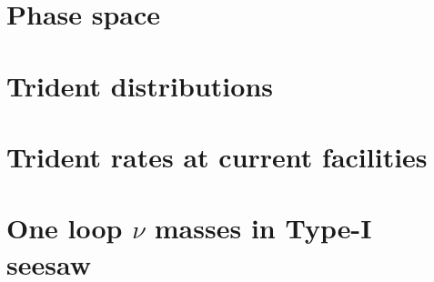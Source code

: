 \documentclass[openany,twoside,frontopenright]{ip3thesis}
\begin{document}
\appendixpageoff
\begin{appendices}
\let\clearpage\relax
\chapter{Phase space}


\cleardoublepage
\chapter{Trident distributions}


\cleardoublepage
\chapter{Trident rates at current facilities}


\cleardoublepage
\chapter{One loop $\nu$ masses in Type-I seesaw}

\end{appendices}



\end{document}
